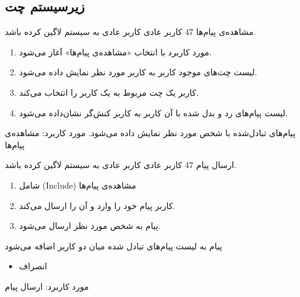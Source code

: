 \newpage
\subsection{زیرسیستم چت}

{
	\usecase
	{مشاهده‌ی پیام‌ها}
	{47}
	{}
	{کاربر عادی}
	{}
	{کاربر عادی به سیستم لاگین کرده باشد.}
	{
		\vspace*{-0.6cm}
		\begin{enumerate}
			\item 
			مورد کاربرد با انتخاب «مشاهده‌ی پیام‌ها» آغاز می‌شود.
			\item
			لیست چت‌های موجود کاربر به کاربر مورد نظر نمایش داده می‌شود.
			\item
			کاربر یک چت مربوط به یک کاربر را انتخاب می‌کند.
			\item 
			لیست پیام‌های رد و بدل شده با آن کاربر به کاربر کنش‌گر نشان‌داده می‌شود.
		\end{enumerate}
	}
	{پیام‌های تبادل‌شده با شخص مورد نظر نمایش داده می‌شود.}
	{}
	{
		مورد کاربرد: مشاهده‌ی پیام‌ها 
	}
}

{
	\usecase
	{ارسال پیام}
	{47}
	{}
	{کاربر عادی}
	{}
	{کاربر عادی به سیستم لاگین کرده باشد.}
	{
		\vspace*{-0.6cm}
		\begin{enumerate}
			\item 
			شامل (Include) مشاهده‌ی پیام‌ها
			\item
			کاربر پیام خود را وارد و آن را ارسال می‌کند.
			\item
			پیام به شخص مورد نظر ارسال می‌شود.
		\end{enumerate}
	}
	{پیام به لیست پیام‌های تبادل شده میان دو کاربر اضافه می‌شود}
	{
		\begin{itemize}
			\item
			انصراف
		\end{itemize}
	}
	{
		مورد کاربرد: ارسال پیام 
	}
}
